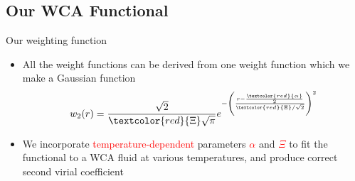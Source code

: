 \documentclass{beamer}
\renewcommand{\vec}[1]{\mathbf{#1}}
\begin{document}
\subsection{Our WCA Functional}
\begin{frame}{Our weighting function}
    \begin{itemize}
      \item All the weight functions can be derived from one weight function which we make a Gaussian function
       \begin{displaymath}\label{eq:weights} 
           w_2(r) %
            = \frac{\sqrt{2}}{\textcolor{red}{\Xi}\sqrt\pi}e^{-\left(\frac{r-\frac{\textcolor{red}{\alpha}}{2}}{\textcolor{red}{\Xi}/\sqrt{2}}\right)^2} 
       \end{displaymath}
      \item We incorporate \textcolor{red}{temperature-dependent} parameters \textcolor{red}{$\alpha$} 
      and \textcolor{red}{$\Xi$} 
      to fit the functional to a WCA fluid at various temperatures, and produce correct 
      second virial coefficient
    \end{itemize}

\end{frame}
\end{document}
